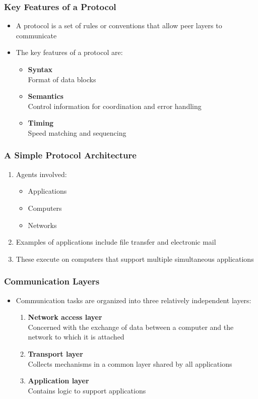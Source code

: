 \documentclass[pdflatex,compress]{beamer}
\begin{document}
\begin{frame}
	\frametitle{Key Features of a Protocol}
	\begin{itemize}
		\item A protocol is a set of rules or conventions that allow peer layers to communicate
		\item The key features of a protocol are:
		\begin{itemize}
			\item \textbf{Syntax}\\
			Format of data blocks
			\item \textbf{Semantics}\\
			Control information for coordination and error handling
			\item \textbf{Timing}\\
			Speed matching and sequencing
		\end{itemize}
	\end{itemize}
\end{frame}

\begin{frame}
	\frametitle{A Simple Protocol Architecture}
	\begin{enumerate}
		\item Agents involved:
		\begin{itemize}
			\item Applications
			\item Computers
			\item Networks
		\end{itemize}
		\item Examples of applications include file transfer and electronic mail
		\item These execute on computers that support multiple simultaneous applications
	\end{enumerate}
\end{frame}

\begin{frame}
	\frametitle{Communication Layers}
	\begin{itemize}
		\item Communication tasks are organized into three relatively independent layers:
		\begin{enumerate}
			\item \textbf{Network access layer}\\
			Concerned with the exchange of data between a computer and the network to which it is attached
			\item \textbf{Transport layer}\\
			Collects mechanisms in a common layer shared by all applications
			\item \textbf{Application layer}\\
			Contains logic to support applications
		\end{enumerate}
	\end{itemize}
\end{frame}
\end{document}
